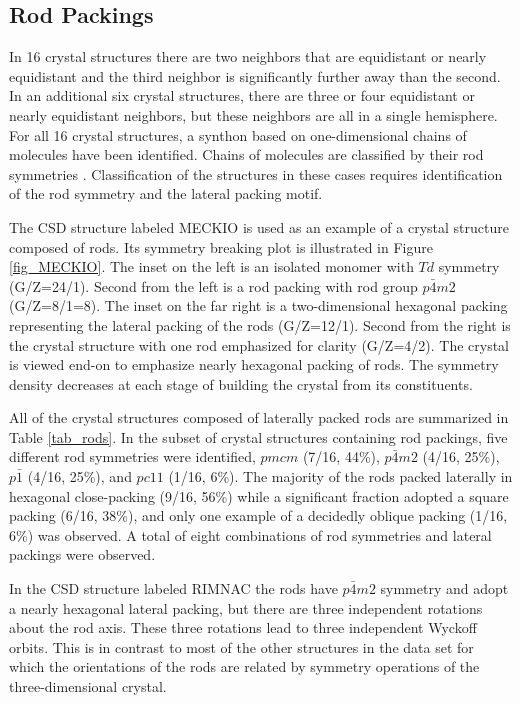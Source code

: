 \documentclass{iucr}              %
\begin{document}
\subsection{Rod Packings}

In 16 crystal structures there are two neighbors that are equidistant or nearly equidistant and the third neighbor is significantly further away than the second.  In an additional six crystal structures, there are three or four equidistant or nearly equidistant neighbors, but these neighbors are all in a single hemisphere.  For all 16 crystal structures, a synthon based on one-dimensional chains of molecules have been identified.  Chains of molecules are classified by their rod symmetries \cite{Hahn02}.  Classification of the structures in these cases requires identification of the rod symmetry and the lateral packing motif.

The CSD structure labeled MECKIO is used as an example of a crystal structure composed of rods.  Its symmetry breaking plot is illustrated in Figure \ref{fig_MECKIO}.  The inset on the left is an isolated monomer with $Td$ symmetry (G/Z=24/1).  Second from the left is a rod packing with rod group $p\bar{4}m2$ (G/Z=8/1=8).  The inset on the far right is a two-dimensional hexagonal packing representing the lateral packing of the rods (G/Z=12/1).  Second from the right is the crystal structure with one rod emphasized for clarity (G/Z=4/2).  The crystal is viewed end-on to emphasize nearly hexagonal packing of rods.  The symmetry density decreases at each stage of building the crystal from its constituents.  

All of the crystal structures composed of laterally packed rods are summarized in Table \ref{tab_rods}.  In the subset of crystal structures containing rod packings, five different rod symmetries were identified, $pmcm$ (7/16, 44\%), $p\bar{4}m2$ (4/16, 25\%), $p\bar{1}$ (4/16, 25\%), and $pc11$ (1/16, 6\%).  The majority of the rods packed laterally in hexagonal close-packing (9/16, 56\%) while a significant fraction adopted a square packing (6/16, 38\%), and only one example of a decidedly oblique packing (1/16, 6\%) was observed.  A total of eight combinations of rod symmetries and lateral packings were observed.

In the CSD structure labeled RIMNAC the rods have $p\bar{4}m2$ symmetry and adopt a nearly hexagonal lateral packing, but there are three independent rotations about the rod axis.  These three rotations lead to three independent Wyckoff orbits.  This is in contrast to most of the other structures in the data set for which the orientations of the rods are related by symmetry operations of the three-dimensional crystal.
\end{document}

